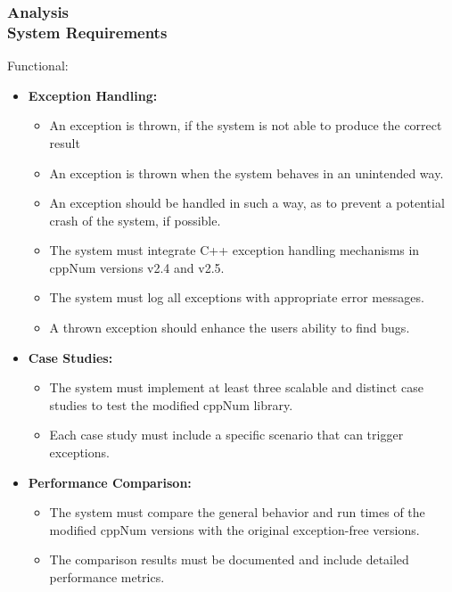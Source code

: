 \documentclass[ucs,10pt]{beamer}
\begin{document}
\begin{frame}
\frametitle{Analysis \\
	\small \color{rwth-blue} System Requirements}
	Functional:
	\begin{itemize}
		\item \textbf{Exception Handling:}
		\begin{itemize}
			\item An exception is thrown, if the system is not able to produce the correct result
			\item An exception is thrown when the system behaves in an unintended way. 
                \item An exception should be handled in such a way, as to prevent a potential crash of the system, if possible.
			\item The system must integrate C++ exception handling mechanisms in cppNum versions v2.4 and v2.5.
			\item The system must log all exceptions with appropriate error messages.
                \item A thrown exception should enhance the users ability to find bugs.
		\end{itemize}
		\item \textbf{Case Studies:}
		\begin{itemize}
			\item The system must implement at least three scalable and distinct case studies to test the modified cppNum library.
			\item Each case study must include a specific scenario that can trigger exceptions.
		\end{itemize}
		\item \textbf{Performance Comparison:}
		\begin{itemize}
			\item The system must compare the general behavior and run times of the modified cppNum versions with the original exception-free versions.
			\item The comparison results must be documented and include detailed performance metrics.
		\end{itemize}
	\end{itemize}
\end{frame}
\end{document}

